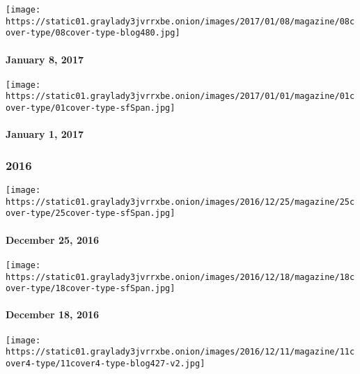 \texttt{[image: https://static01.graylady3jvrrxbe.onion/images/2017/01/08/magazine/08cover-type/08cover-type-blog480.jpg]}

\hypertarget{january-8-2017}{%
\paragraph{January 8, 2017}\label{january-8-2017}}

\href{http://www.nytimes3xbfgragh.onion/indexes/2017/01/01/magazine/index.html}{}

\texttt{[image: https://static01.graylady3jvrrxbe.onion/images/2017/01/01/magazine/01cover-type/01cover-type-sfSpan.jpg]}

\hypertarget{january-1-2017}{%
\paragraph{January 1, 2017}\label{january-1-2017}}

\hypertarget{2016}{%
\subsubsection{2016}\label{2016}}

\href{http://www.nytimes3xbfgragh.onion/indexes/2016/12/25/magazine/index.html}{}

\texttt{[image: https://static01.graylady3jvrrxbe.onion/images/2016/12/25/magazine/25cover-type/25cover-type-sfSpan.jpg]}

\hypertarget{december-25-2016}{%
\paragraph{December 25, 2016}\label{december-25-2016}}

\href{http://www.nytimes3xbfgragh.onion/indexes/2016/12/18/magazine/index.html}{}

\texttt{[image: https://static01.graylady3jvrrxbe.onion/images/2016/12/18/magazine/18cover-type/18cover-type-sfSpan.jpg]}

\hypertarget{december-18-2016}{%
\paragraph{December 18, 2016}\label{december-18-2016}}

\href{http://www.nytimes3xbfgragh.onion/indexes/2016/12/11/magazine/index.html}{}

\texttt{[image: https://static01.graylady3jvrrxbe.onion/images/2016/12/11/magazine/11cover4-type/11cover4-type-blog427-v2.jpg]}

